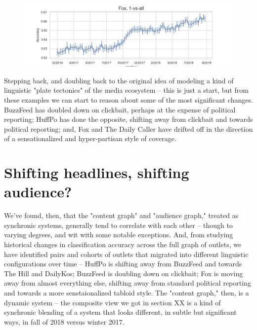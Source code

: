 \documentclass{scrartcl}
\begin{document}
\begin{figure}[H]
  \centering
  \includegraphics[width=\textwidth]{figures/ts-ova-fox.png}
\end{figure}

Stepping back, and doubling back to the original idea of modeling a kind of linguistic "plate tectonics" of the media ecosystem -- this is just a start, but from these examples we can start to reason about some of the most significant changes. BuzzFeed has doubled down on clickbait, perhaps at the expense of political reporting; HuffPo has done the opposite, shifting away from clickbait and towards political reporting; and, Fox and The Daily Caller have drifted off in the direction of a sensationalized and hyper-partisan style of coverage.

\section{Shifting headlines, shifting audience?}

We've found, then, that the "content graph" and "audience graph," treated as synchronic systems, generally tend to correlate with each other -- though to varying degrees, and wit with some notable exceptions. And, from studying historical changes in classification accuracy across the full graph of outlets, we have identified pairs and cohorts of outlets that migrated into different linguistic configurations over time -- HuffPo is shifting away from BuzzFeed and towards The Hill and DailyKos; BuzzFeed is doubling down on clickbait; Fox is moving away from almost everything else, shifting away from standard political reporting and towards a more senstaionalized tabloid style. The "content graph," then, is a dynamic system -- the composite view we got in section XX is a kind of synchronic blending of a system that looks different, in subtle but significant ways, in fall of 2018 versus winter 2017.
\end{document}
